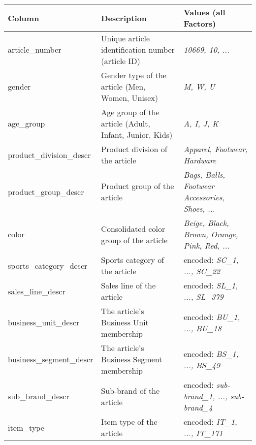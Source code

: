 \begin{table}[H]
\setlength\arrayrulewidth{1pt}  
\centering
\begin{adjustbox}{max width=\textwidth}
\begin{tabular}{|l|l|l|}
\hline
\rowcolor{Gray}
\textbf{Column}           & \textbf{Description}                                   & \textbf{Values (all Factors)}                 \\ \hline
article\_number           & Unique article identification number (article ID)      & \textit{10669, 10, ...}                                \\ \hline
gender                    & Gender type of the article (Men, Women, Unisex)        & \textit{M, W, U}                                       \\ \hline
age\_group                & Age group of the article (Adult, Infant, Junior, Kids) & \textit{A, I, J, K}                                    \\ \hline
product\_division\_descr  & Product division of the article                        & \textit{Apparel, Footwear, Hardware}                   \\ \hline
product\_group\_descr     & Product group of the article                           & \textit{Bags, Balls, Footwear Accessories, Shoes, ...} \\ \hline
color                     & Consolidated color group of the article                & \textit{Beige, Black, Brown, Orange, Pink, Red, ... }  \\ \hline
sports\_category\_descr   & Sports category of the article                         & encoded: \textit{SC\_1, ..., SC\_22 }                  \\ \hline
sales\_line\_descr        & Sales line of the article                              & encoded: \textit{SL\_1, ..., SL\_379 }                 \\ \hline
business\_unit\_descr     & The article's Business Unit membership                 & encoded:\textit{ BU\_1, ..., BU\_18   }                \\ \hline
business\_segment\_descr  & The article's Business Segment membership              & encoded: \textit{BS\_1, ..., BS\_49  }                 \\ \hline
sub\_brand\_descr         & Sub-brand of the article                               & encoded: \textit{sub-brand\_1, ..., sub-brand\_4 }     \\ \hline
item\_type                & Item type of the article                               & encoded: \textit{IT\_1, ..., IT\_171 }                 \\ \hline

\end{tabular}
\end{adjustbox}
\end{table}
